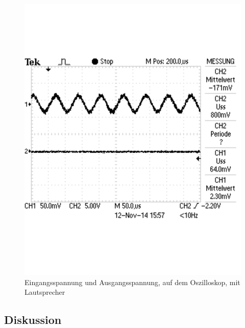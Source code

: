 \documentclass[12pt,a4paper]{article}
\begin{document}
\begin{figure}[H] 
  \centering
    \includegraphics[scale = 0.7]{a_2_2.pdf}
  	\caption[Eingangsspannung und Ausgangsspannung, auf dem Oszilloskop, mit Lautsprecher]{Eingangsspannung und Ausgangsspannung, auf dem Oszilloskop, mit Lautsprecher}
  \label{fig:a_2_2}
\end{figure}

\subsection{Diskussion}
\end{document}
